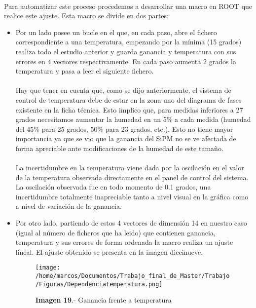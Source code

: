 \paragraph {}
Para automatizar este proceso procedemos a desarrollar una macro en ROOT que realice este ajuste. Esta macro se divide en dos partes:
\begin{itemize}
\item{} Por un lado posee un bucle en el que, en cada paso, abre el fichero correspondiente a una temperatura, empezando por la mínima (15 grados) realiza todo el estudio anterior y guarda ganancia y temperatura con sus errores en 4 vectores respectivamente. En cada paso aumenta 2 grados la temperatura y pasa a leer el siguiente fichero.

\paragraph {}
Hay que tener en cuenta que, como se dijo anteriormente, el sistema de control de temperatura debe de estar en la zona uno del diagrama de fases existente en la ficha técnica. Esto implico que, para medidas inferiores a 27 grados necesitamos aumentar la humedad en un 5\% a cada medida (humedad del 45\% para 25 grados, 50\% para 23 grados, etc.). Esto no tiene mayor importancia ya que se vio que la ganancia del SiPM no se ve afectada de forma apreciable ante modificaciones de la humedad de este tamaño.

\paragraph {}
La incertidumbre en la temperatura viene dada por la oscilación en el valor de la temperatura observada directamente en el panel de control del sistema. La oscilación observada fue en todo momento de 0.1 grados, una incertidumbre totalmente inapreciable tanto a nivel visual en la gráfica como a nivel de variación de la ganancia.

\item {} Por otro lado, partiendo de estos 4 vectores de dimensión 14 en nuestro caso (igual al número de ficheros que ha leido) que contienen ganancia, temperatura y sus errores de forma ordenada la macro realiza un ajuste lineal. El ajuste obtenido se presenta en la imagen diecinueve.

\begin{figure}[hbtp]
\centering
\texttt{[image: /home/marcos/Documentos/Trabajo\_final\_de\_Master/Trabajo/Figuras/Dependenciatemperatura.png]}
\caption{\textbf{Imagen 19}.- Ganancia frente a temperatura}
\end{figure}


\end{itemize}
